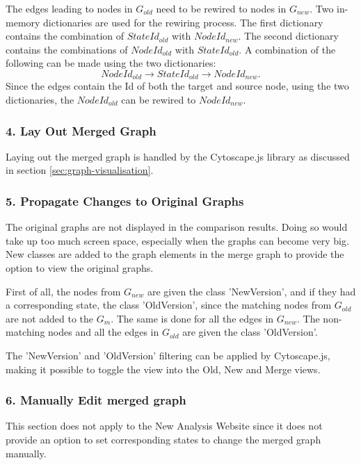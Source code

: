 The edges leading to nodes in $G_{old}$ need to be rewired to nodes in $G_{new}$. Two in-memory dictionaries are used for the rewiring process. The first dictionary contains the combination of $StateId_{old}$ with $NodeId_{new}$. The second dictionary contains the combinations of $NodeId_{old}$ with $StateId_{old}$. A combination of the following can be made using the two dictionaries:
\[ NodeId_{old} \rightarrow  StateId_{old} \rightarrow NodeId_{new}. \]
Since the edges contain the Id of both the target and source node, using the two dictionaries, the $NodeId_{old}$ can be rewired to $NodeId_{new}$.

\subsubsection{4. Lay Out Merged Graph}

Laying out the merged graph is handled by the Cytoscape.js library as discussed in section \ref{sec:graph-visualisation}.

\subsubsection{5. Propagate Changes to Original Graphs}

The original graphs are not displayed in the comparison results. Doing so would take up too much screen space, especially when the graphs can become very big. New classes are added to the graph elements in the merge graph to provide the option to view the original graphs.

First of all, the nodes from $G_{new}$ are given the class 'NewVersion', and if they had a corresponding state, the class 'OldVersion', since the matching nodes from $G_{old}$ are not added to the $G_m$. The same is done for all the edges in $G_{new}$. The non-matching nodes and all the edges in $G_{old}$ are given the class 'OldVersion'.

The 'NewVersion' and 'OldVersion' filtering can be applied by Cytoscape.js, making it possible to toggle the view into the Old, New and Merge views. 

\subsubsection{6. Manually Edit merged graph}

This section does not apply to the New Analysis Website since it does not provide an option to set corresponding states to change the merged graph manually. 